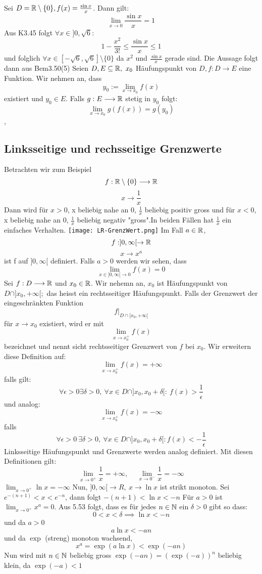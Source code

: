 \Bsp[3.51] Sei \( D = \mathbb{R} \setminus \{0\}, f(x) = \frac{\sin x}{x}\). Dann gilt:
\[ \lim_{ x \rightarrow 0} \frac{\sin x }{x} = 1\]
Aus K3.45 folgt \( \forall x \in ]0, \sqrt{6}:\)
\[ 1-\frac{x^2}{3!} \leq \frac{\sin x}{x} \leq 1\]
und folglich \( \forall x \in [-\sqrt{6}, \sqrt{6}] \setminus \{0\}\) da \( x^2 \) und \( \frac{\sin x}{x}\) gerade sind. Die Aussage folgt dann aus Bem3.50(5)
\Satz[3.52] Seien \(D,E \subseteq \mathbb{R},\  x_0 \) Häufungspunkt von \(D, f: D \longrightarrow E \) eine Funktion. Wir nehmen an, dass
\[y_0 := \lim\limits_{x \rightarrow x_0} f(x)\]
existiert und \(y_0 \in E.\) Falls \(g: E \longrightarrow \mathbb{R} \) stetig in \(y_0\) folgt:
\[ \lim\limits_{x \rightarrow x_0} g(f(x)) = g(y_0)\]
\sep
\subsection{Linksseitige und rechsseitige Grenzwerte}
Betrachten wir zum Beispiel
\[f: \mathbb{R} \setminus \{0\} \longrightarrow \mathbb{R}\]
\[x \longrightarrow \frac{1}{x}\]
Dann wird für \( x > 0\), x beliebig nahe an 0, \(\frac{1}{x}\) beliebig positiv gross und für \(x < 0\), x beliebig nahe an 0, \( \frac{1}{x}\) beliebig negativ "gross".In beiden Fällen hat \( \frac{1}{x}\) ein einfaches Verhalten. \newline
\texttt{[image: LR-GrenzWert.png]} \newline
Im Fall \(a \in \mathbb{R}\),
\[f: ]0,\infty[ \rightarrow \mathbb{R}\]
\[x \rightarrow x^a\]
ist f auf \(]0,\infty[\) definiert. Falls \(a > 0\) werden wir sehen, dass
\[ \lim_{x\in ]0,\infty[\rightarrow 0} f(x) = 0\]
Sei \(f: D \longrightarrow \mathbb{R} \) und \(x_0 \in \mathbb{R} \). Wir nehemn an, \(x_0\) ist Häufungspunkt von \(D \cap ]x_0, +\infty[;\)
das heisst ein rechtsseitiger Häufungspunkt. Falls der Grenzwert der eingeschränkten Funktion
\[f|_{D \cap [x_0,+\infty[}\]
für \(x \longrightarrow x_0\) existiert, wird er mit
\[ \lim_{x \rightarrow x_0^+} f(x)\]
bezeichnet und nennt sicht rechtsseitiger Grenzwert von \(f\) bei \(x_0\).\newline \newline
Wir erweitern diese Definition auf:
\[\lim_{x \rightarrow x_0^+} f(x) = +\infty \]
falls gilt:
\[ \forall \epsilon > 0 \exists \delta > 0, \ \forall x \in D \cap ]x_0,x_0 + \delta[:\ f(x) > \frac{1}{\epsilon}\]
und analog:
\[ \lim_{x \rightarrow x_0^+} f(x) = -\infty \]
falls
\[ \forall \epsilon > 0 \  \exists \delta > 0, \ \forall x \in D \cap ]x_0,x_0+\delta[: f(x) < -\frac{1}{\epsilon}\]
Linksseitige Häufungspunkt und Grenzwerte werden analog definiert. Mit diesen Definitionen gilt:
\[\lim_{x \rightarrow 0^+}\frac{1}{x} = +\infty, \quad\ \lim_{x \rightarrow 0^-}\frac{1}{x} = -\infty \] 
\Bsp[3.53] \( \lim_{x \rightarrow 0^+} \ln x = -\infty\)
Nun, \(]0,\infty[ \rightarrow R, \ x \rightarrow \ln x\) ist strikt monoton. Sei \( e^{-(n+1)} < x < e^{-n}\), dann folgt \(-(n+1) < \ln x < -n\) \newline
\Bsp[3.54] Für \( a > 0\) ist \( \lim_{x \rightarrow 0^+} x^a =0.\) Aus 5.53 folgt, dass es für jedes \(n \in \mathbb{N}\) ein \( \delta > 0\) gibt so dass:
\[ 0 < x < \delta \implies \ln x < -n\]
und da \( a > 0\)
\[ a \ln x < -an\]
und da \( \exp \) (streng) monoton wachsend,
\[ x^a = \exp(a \ln x) < \exp(-an)\]
Nun wird mit \(n \in \mathbb{N}\) beliebig gross \( \exp(-an) = (\exp(-a))^n\) beliebig klein, da \(\exp(-a) < 1\)